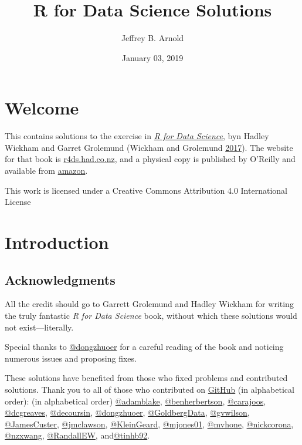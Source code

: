 \documentclass[]{book}
\title{R for Data Science Solutions}
\author{Jeffrey B. Arnold}
\date{January 03, 2019}
\theoremstyle{plain}
\theoremstyle{remark}
\begin{document}
\maketitle

{
\setcounter{tocdepth}{1}
\tableofcontents
}
\hypertarget{welcome}{%
\chapter*{Welcome}\label{welcome}}

This contains solutions to the exercise in \href{http://amzn.to/2aHLAQ1}{\emph{R for Data Science}}, byn Hadley Wickham and Garret Grolemund (Wickham and Grolemund \protect\hyperlink{ref-WickhamGrolemund2017}{2017}).
The website for that book is \href{http://r4ds.had.co.nz/}{r4ds.had.co.nz}, and a physical
copy is published by O'Reilly and available from \href{http://amzn.to/2aHLAQ1}{amazon}.

This work is licensed under a Creative Commons Attribution 4.0 International License

\hypertarget{introduction}{%
\chapter{Introduction}\label{introduction}}

\hypertarget{acknowledgments}{%
\section*{Acknowledgments}\label{acknowledgments}}

All the credit should go to Garrett Grolemund and Hadley Wickham for writing the truly fantastic \emph{R for Data Science} book,
without which these solutions would not exist---literally.

Special thanks to \href{https://github.com/dongzhuoer}{@dongzhuoer} for a careful reading of the book
and noticing numerous issues and proposing fixes.

These solutions have benefited from those who fixed problems and contributed
solutions. Thank you to all of those who contributed on
\href{https://github.com/jrnold/r4ds-exercise-solutions/graphs/contributors}{GitHub}
(in alphabetical order):
(in alphabetical order) \href{https://github.com/adamblake}{@adamblake}, \href{https://github.com/benherbertson}{@benherbertson}, \href{https://github.com/carajoos}{@carajoos}, \href{https://github.com/dcgreaves}{@dcgreaves}, \href{https://github.com/decoursin}{@decoursin}, \href{https://github.com/dongzhuoer}{@dongzhuoer}, \href{https://github.com/GoldbergData}{@GoldbergData}, \href{https://github.com/gvwilson}{@gvwilson}, \href{https://github.com/JamesCuster}{@JamesCuster}, \href{https://github.com/jmclawson}{@jmclawson}, \href{https://github.com/KleinGeard}{@KleinGeard}, \href{https://github.com/mjones01}{@mjones01}, \href{https://github.com/mvhone}{@mvhone}, \href{https://github.com/nickcorona}{@nickcorona}, \href{https://github.com/nzxwang}{@nzxwang}, \href{https://github.com/RandallEW}{@RandallEW}, and\href{https://github.com/tinhb92}{@tinhb92}.
\end{document}
